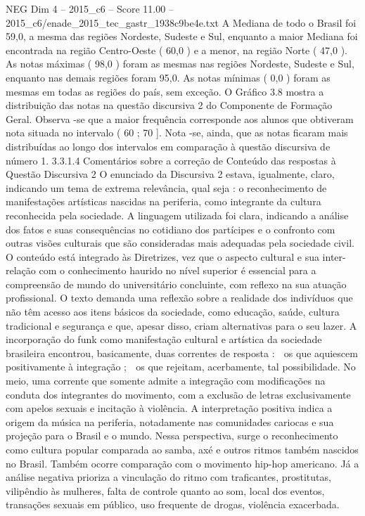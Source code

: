 \begin{textsample}{NEG Dim 4 – 2015\_c6 – Score 11.00 – 2015\_c6/enade\_2015\_tec\_gastr\_1938c9be4e.txt}
A Mediana de todo o Brasil foi 59,0, a mesma das regiões Nordeste, Sudeste e Sul, enquanto a maior Mediana foi encontrada na região Centro-Oeste ( 60,0 ) e a menor, na região Norte ( 47,0 ).
As notas máximas ( 98,0 ) foram as mesmas nas regiões Nordeste, Sudeste e Sul, enquanto nas demais regiões foram 95,0.
As notas mínimas ( 0,0 ) foram as mesmas em todas as regiões do país, sem exceção.
O Gráfico 3.8 mostra a distribuição das notas na questão discursiva 2 do Componente de Formação Geral.
Observa -se que a maior frequência corresponde aos alunos que obtiveram nota situada no intervalo ( 60 ; 70 ].
Nota -se, ainda, que as notas ficaram mais distribuídas ao longo dos intervalos em comparação à questão discursiva de número 1. 3.3.1.4 Comentários sobre a correção de Conteúdo das respostas à Questão Discursiva 2 O enunciado da Discursiva 2 estava, igualmente, claro, indicando um tema de extrema relevância, qual seja : o reconhecimento de manifestações artísticas nascidas na periferia, como integrante da cultura reconhecida pela sociedade.
A linguagem utilizada foi clara, indicando a análise dos fatos e suas consequências no cotidiano dos partícipes e o confronto com outras visões culturais que são consideradas mais adequadas pela sociedade civil.
O conteúdo está integrado às Diretrizes, vez que o aspecto cultural e sua inter-relação com o conhecimento haurido no nível superior é essencial para a compreensão de mundo do universitário concluinte, com reflexo na sua atuação profissional.
O texto demanda uma reflexão sobre a realidade dos indivíduos que não têm acesso aos itens básicos da sociedade, como educação, saúde, cultura tradicional e segurança e que, apesar disso, criam alternativas para o seu lazer.
A incorporação do funk como manifestação cultural e artística da sociedade brasileira encontrou, basicamente, duas correntes de resposta :  os que aquiescem positivamente à integração ;  os que rejeitam, acerbamente, tal possibilidade.
No meio, uma corrente que somente admite a integração com modificações na conduta dos integrantes do movimento, com a exclusão de letras exclusivamente com apelos sexuais e incitação à violência.
A interpretação positiva indica a origem da música na periferia, notadamente nas comunidades cariocas e sua projeção para o Brasil e o mundo.
Nessa perspectiva, surge o reconhecimento como cultura popular comparada ao samba, axé e outros ritmos também nascidos no Brasil.
Também ocorre comparação com o movimento hip-hop americano.
Já a análise negativa prioriza a vinculação do ritmo com traficantes, prostitutas, vilipêndio às mulheres, falta de controle quanto ao som, local dos eventos, transações sexuais em público, uso frequente de drogas, violência exacerbada.

\end{textsample}
